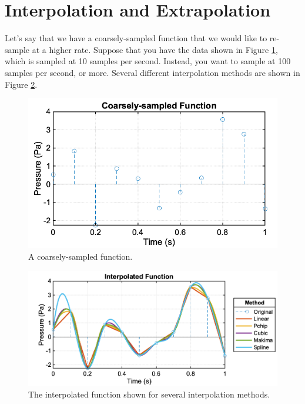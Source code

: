 \section{Interpolation and Extrapolation} \label{sec:Interpolation and Extrapolation}

Let's say that we have a coarsely-sampled function that we would like to re-sample at a higher rate. Suppose that you have the data shown in Figure \ref{fig:Coarsely-sampled Function}, which is sampled at 10 samples per second. Instead, you want to sample at 100 samples per second, or more. Several different interpolation methods are shown in Figure \ref{fig:Interpolated Function}.

\begin{figure}[htp]
    \centering
    \includegraphics[width = 5 in]{Chapters/Computational Methods/Figures/Coarsely-sampled Function.png}
    \caption{A coarsely-sampled function.}
    \label{fig:Coarsely-sampled Function}
\end{figure}

\begin{figure}[htp]
    \centering
    \includegraphics[width = 6.5 in]{Chapters/Computational Methods/Figures/Interpolated Function.png}
    \caption{The interpolated function shown for several interpolation methods.}
    \label{fig:Interpolated Function}
\end{figure}

